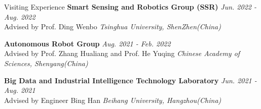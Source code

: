 \begin{rSection}{Visiting Experience}
	{\bf Smart Sensing and Robotics Group (SSR)} \hfill {\em Jun. 2022 - Aug. 2022} \\
	{Advised by Prof. Ding Wenbo} \hfill {\em Tsinghua University, ShenZhen(China)}

	{\bf Autonomous Robot Group} \hfill {\em Aug. 2021 - Feb. 2022} \\
	{Advised by Prof. Zhang Hualiang and Prof. He Yuqing} \hfill {\em Chinese Academy of Sciences, Shenyang(China)}
	
	{\bf Big Data and Industrial Intelligence Technology Laboratory} \hfill {\em Jun. 2021 - Aug. 2021} \\
	{Advised by Engineer Bing Han} \hfill {\em Beihang University, Hangzhou(China)}
	
\end{rSection}
